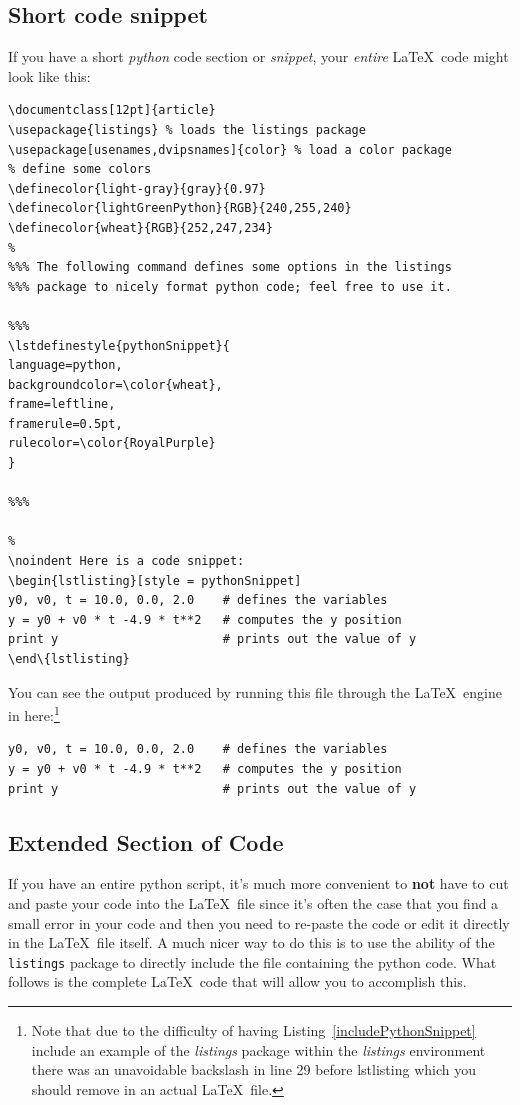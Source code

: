 \subsection{Short code snippet}
If you have a short \textit{python} code section or \textit{snippet}, your \textit{entire} \LaTeX\ code might look like this:
\begin{lstlisting}[label=includePythonSnippet, caption =Including a short python snippet,style=myLaTeXStyle, firstnumber=1]
\documentclass[12pt]{article}
\usepackage{listings} % loads the listings package
\usepackage[usenames,dvipsnames]{color} % load a color package
% define some colors
\definecolor{light-gray}{gray}{0.97} 
\definecolor{lightGreenPython}{RGB}{240,255,240}
\definecolor{wheat}{RGB}{252,247,234}
%
%%% The following command defines some options in the listings
%%% package to nicely format python code; feel free to use it.

%%%
\lstdefinestyle{pythonSnippet}{
language=python, 
backgroundcolor=\color{wheat}, 
frame=leftline, 
framerule=0.5pt, 
rulecolor=\color{RoyalPurple}
}

%%%

%
\noindent Here is a code snippet:
\begin{lstlisting}[style = pythonSnippet]
y0, v0, t = 10.0, 0.0, 2.0    # defines the variables 
y = y0 + v0 * t -4.9 * t**2   # computes the y position 
print y                       # prints out the value of y 
\end\{lstlisting} 

\end{lstlisting}


You can see the output produced by running this file through the \LaTeX\ engine in here:\footnote{Note that due to the difficulty of having Listing~\ref{includePythonSnippet} include an example of the \textit{listings} package within the \textit{listings} environment there was an unavoidable backslash in line 29 before lstlisting which you should remove in an actual \LaTeX\ file. }
\begin{lstlisting}[style=pythonSnippet]
y0, v0, t = 10.0, 0.0, 2.0    # defines the variables 
y = y0 + v0 * t -4.9 * t**2   # computes the y position 
print y                       # prints out the value of y 
\end{lstlisting} 

\subsection{Extended Section of Code}
If you have an entire python script, it's much more convenient to \textbf{not} have to cut and paste your code into the \LaTeX\ file since it's often the case that you find a small error in your code and then you need to re-paste the code or edit it directly in the \LaTeX\ file itself. A much nicer way to do this is to use the ability of the \verb!listings! package to directly include the file containing the python code. What follows is the complete \LaTeX\ code that will allow you to accomplish this. \\[5mm]

